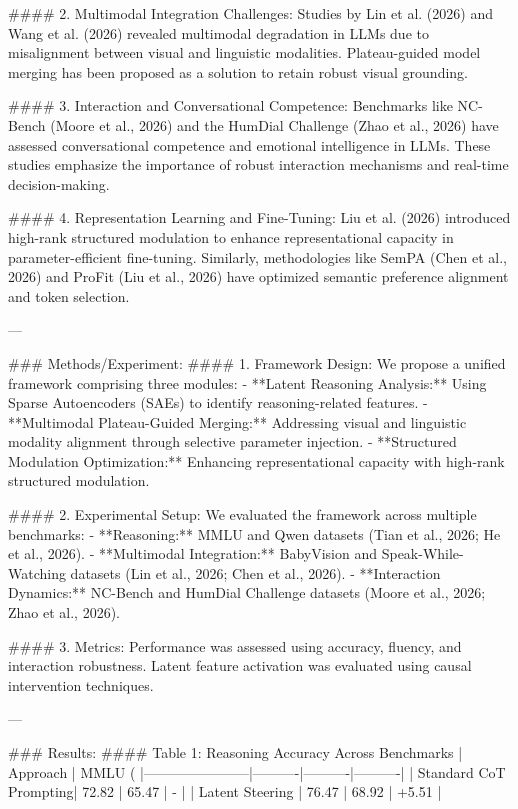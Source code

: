 #### 2. Multimodal Integration Challenges:
Studies by Lin et al. (2026) and Wang et al. (2026) revealed multimodal degradation in LLMs due to misalignment between visual and linguistic modalities. Plateau-guided model merging has been proposed as a solution to retain robust visual grounding.

#### 3. Interaction and Conversational Competence:
Benchmarks like NC-Bench (Moore et al., 2026) and the HumDial Challenge (Zhao et al., 2026) have assessed conversational competence and emotional intelligence in LLMs. These studies emphasize the importance of robust interaction mechanisms and real-time decision-making.

#### 4. Representation Learning and Fine-Tuning:
Liu et al. (2026) introduced high-rank structured modulation to enhance representational capacity in parameter-efficient fine-tuning. Similarly, methodologies like SemPA (Chen et al., 2026) and ProFit (Liu et al., 2026) have optimized semantic preference alignment and token selection.

---

### Methods/Experiment:
#### 1. Framework Design:
We propose a unified framework comprising three modules:
- **Latent Reasoning Analysis:** Using Sparse Autoencoders (SAEs) to identify reasoning-related features.
- **Multimodal Plateau-Guided Merging:** Addressing visual and linguistic modality alignment through selective parameter injection.
- **Structured Modulation Optimization:** Enhancing representational capacity with high-rank structured modulation.

#### 2. Experimental Setup:
We evaluated the framework across multiple benchmarks:
- **Reasoning:** MMLU and Qwen datasets (Tian et al., 2026; He et al., 2026).
- **Multimodal Integration:** BabyVision and Speak-While-Watching datasets (Lin et al., 2026; Chen et al., 2026).
- **Interaction Dynamics:** NC-Bench and HumDial Challenge datasets (Moore et al., 2026; Zhao et al., 2026).

#### 3. Metrics:
Performance was assessed using accuracy, fluency, and interaction robustness. Latent feature activation was evaluated using causal intervention techniques.

---

### Results:
#### Table 1: Reasoning Accuracy Across Benchmarks
| Approach              | MMLU (%
|-----------------------|----------|----------|----------|
| Standard CoT Prompting| 72.82    | 65.47    | -        |
| Latent Steering       | 76.47    | 68.92    | +5.51    |

